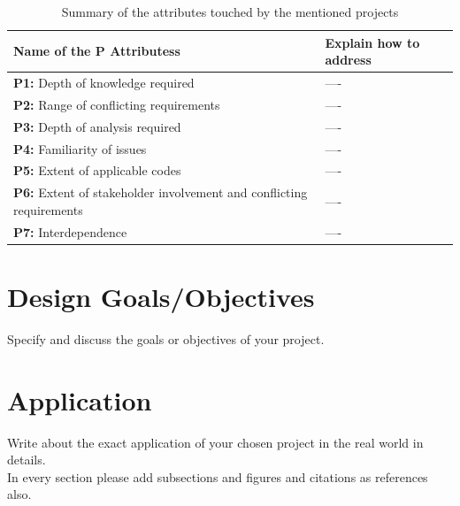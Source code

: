\documentclass[12pt]{report}
\begin{document}
\begin{table}[htbp]
   \centering
    \caption{Summary of the attributes touched by the mentioned projects}
    \begin{tabular}{|p{6.0 cm}|p{8 cm}|}
    \toprule
        \textbf{Name of the P Attributess} & \textbf{Explain how to address}  \\
        \midrule

    \textbf{P1:} Depth of knowledge required  &  ---- \\
      \hline
       
    \textbf{P2:} Range of conflicting
     requirements  &  ---- \\
      \hline

    \textbf{P3:} Depth of analysis required  &  ---- \\
    \hline
    
    \textbf{P4:} Familiarity of issues  &  ---- \\ 
    \hline
    \textbf{P5:} Extent of applicable codes  &  ---- \\
      \hline
       
    \textbf{P6:} Extent of stakeholder
     involvement and conflicting
     requirements  &  ---- \\
      \hline

    \textbf{P7:} Interdependence  &  ---- \\
    \hline
        
    \end{tabular}
    \label{tab:CEP}
\end{table}

\section{Design Goals/Objectives}
Specify and discuss the goals or objectives of your project.

\section{Application}
Write about the exact application of your chosen project in the real world in details.\\In every section please add subsections and figures and citations as references\cite{farokhzad2009impact} also.





\newpage
\end{document}
